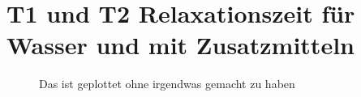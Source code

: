 \section{T1 und T2 Relaxationszeit für Wasser und mit Zusatzmitteln}
\begin{figure}[H]
    \centering
    
    \caption{Das ist geplottet ohne irgendwas gemacht zu haben}
\end{figure}